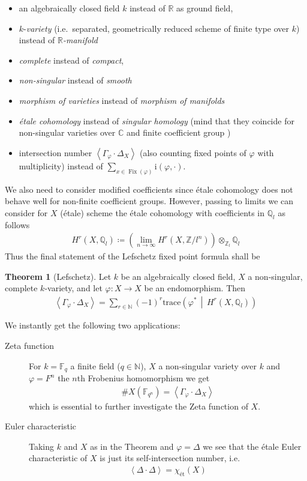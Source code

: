 \documentclass[english]{scrartcl}
\theoremstyle{definition}
\newtheorem{Thm}[Def]{Theorem}
\theoremstyle{remark}
\newcommand*{\N}{\mathds{N}}
\newcommand*{\Z}{\mathds{Z}}
\newcommand*{\Q}{\mathds{Q}}
\newcommand*{\R}{\mathds{R}}
\newcommand*{\C}{\mathds{C}}
\newcommand*{\fF}{\mathds{F}} %
\newcommand*{\Zmod}[1]{\Z/#1} %
\newcommand*{\Zl}{\Z_l} %
\newcommand*{\Ql}{\Q_l} %
\newcommand*{\idest}{i.e.\ }
\newcommand*{\intProd}[2]{{#1\cdot#2}} %
\newcommand*{\intNum}[1]{{\left\langle{#1}\right\rangle}} %
\newcommand*{\Graph}[1]{{\Gamma_{#1}}} %
\newcommand*{\Diag}[1]{{\Delta_{#1}}} %
\newcommand*{\trace}[2]{{\text{trace}\left(#1 \,\middle|\, #2 \right)}} %
\renewcommand*{\phi}{\varphi}
\begin{document}
\begin{itemize}
\item an algebraically closed field $k$ instead of $\R$ as ground field,
\item $k$-\emph{variety}
  (\idest separated, geometrically reduced scheme of finite type over $k$)
  instead of \emph{$\R$-manifold}
\item \emph{complete} instead of \emph{compact},
\item \emph{non-singular} instead of \emph{smooth}
\item \emph{morphism of varieties} instead of \emph{morphism of manifolds}
\item \emph{étale cohomology} instead of \emph{singular homology}
  (mind that they coincide for non-singular varieties over $\C$ and
  finite coefficient group \cite[see][Thm.~21.1]{milne})
\item intersection number $\intNum{\intProd{\Graph{\phi}}{\Diag{X}}}$
  (also counting fixed points of $\phi$ with multiplicity)
  instead of $\sum_{x\in\operatorname{Fix}(\phi)}\mathrm{i}(\phi,\cdot)$.
\end{itemize}
We also need to consider modified coefficients since étale cohomology
does not behave well for non-finite coefficient groups. However,
passing to limits we can consider for $X$ (étale) scheme the étale
cohomology with coefficients in $\Ql$ as follows
\begin{gather*}
  H^r(X,\Ql)\coloneqq
  \left(\lim_{n\to\infty}H^r(X,\Zmod{l^n})\right)\otimes_{\Zl}\Ql
\end{gather*}
Thus the final statement of the Lefschetz fixed point formula shall be
\begin{Thm}[Lefschetz]\label{lefschetzthm:motivation}
  Let $k$ be an algebraically closed field, $X$ a non-singular,
  complete $k$-variety, and let $\phi\colon X\to X$ be an
  endomorphism. Then
  \begin{gather*}
    \intNum{\intProd{\Graph{\phi}}{\Diag{X}}}
    = \sum_{r\in\N}(-1)^r\trace{\phi^*}{H^r(X,\Ql)}
  \end{gather*}
\end{Thm}

We instantly get the following two applications:
\begin{description}
\item[Zeta function] For
  $k=\fF_{q}$ a finite field ($q\in\N$),
  $X$ a non-singular variety over $k$ and
  $\phi=F^n$ the $n$th Frobenius homomorphism
  we get
  \begin{gather*}
    \#X(\fF_{q^n}) = \intNum{\intProd{\Graph\phi}{\Diag X}}
  \end{gather*}
  which is essential to further investigate the Zeta function of $X$.
\item[Euler characteristic] Taking $k$ and $X$ as in the Theorem and
  $\phi=\Delta$ we see that the étale Euler characteristic of $X$ is
  just its self-intersection number, \idest
  \begin{gather*}
    \intNum{\intProd{\Delta}{\Delta}} = \chi_{\text{ét}}(X)
  \end{gather*}
\end{description}
\end{document}
